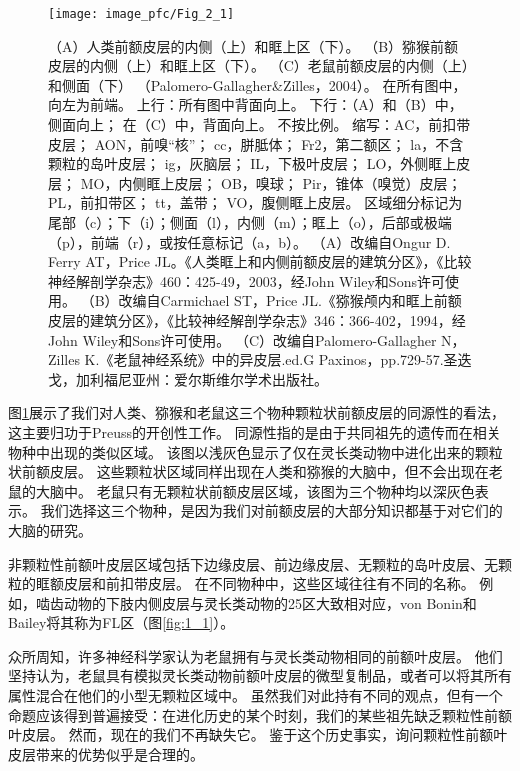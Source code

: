 \begin{figure}[!htb]
	\centering
	\texttt{[image: image\_pfc/Fig\_2\_1]}
	\caption{（A）人类前额皮层的内侧（上）和眶上区（下）\cite{ongur2003architectonic}。 
		（B）猕猴前额皮层的内侧（上）和眶上区（下）\cite{carmichael1994architectonic}。 
		（C）老鼠前额皮层的内侧（上）和侧面（下）
		（Palomero-Gallagher\&Zilles，2004）。
		在所有图中，向左为前端。
		上行：所有图中背面向上。
		下行：（A）和（B）中，侧面向上；
		在（C）中，背面向上。
		不按比例。
		缩写：AC，前扣带皮层；
		AON，前嗅“核”；
		cc，胼胝体；
		Fr2，第二额区；
		la，不含颗粒的岛叶皮层；
		ig，灰脑层；
		IL，下极叶皮层；
		LO，外侧眶上皮层；
		MO，内侧眶上皮层；
		OB，嗅球；
		Pir，锥体（嗅觉）皮层；
		PL，前扣带区；
		tt，盖带；
		VO，腹侧眶上皮层。
		区域细分标记为尾部（c）；下（i）；侧面（l），内侧（m）；眶上（o），后部或极端（p），前端（r），或按任意标记（a，b）。
		（A）改编自Ongur D. Ferry AT，Price JL。《人类眶上和内侧前额皮层的建筑分区》，《比较神经解剖学杂志》460：425-49，2003，经John Wiley和Sons许可使用。 
		（B）改编自Carmichael ST，Price JL.《猕猴颅内和眶上前额皮层的建筑分区》，《比较神经解剖学杂志》346：366-402，1994，经John Wiley和Sons许可使用。 
		（C）改编自Palomero-Gallagher N，Zilles K.《老鼠神经系统》中的异皮层.ed.G Paxinos，pp.729-57.圣迭戈，加利福尼亚州：爱尔斯维尔学术出版社。\label{fig:fig_2_1}}
\end{figure}

图\ref{fig:fig_2_1}展示了我们对人类、猕猴和老鼠这三个物种颗粒状前额皮层的同源性的看法，这主要归功于Preuss\cite{Preuss1991a}的开创性工作。
同源性指的是由于共同祖先的遗传而在相关物种中出现的类似区域。
该图以浅灰色显示了仅在灵长类动物中进化出来的颗粒状前额皮层。
这些颗粒状区域同样出现在人类和猕猴的大脑中，但不会出现在老鼠的大脑中。
老鼠只有无颗粒状前额皮层区域，该图为三个物种均以深灰色表示。
我们选择这三个物种，是因为我们对前额皮层的大部分知识都基于对它们的大脑的研究。


非颗粒性前额叶皮层区域包括下边缘皮层、前边缘皮层、无颗粒的岛叶皮层、无颗粒的眶额皮层和前扣带皮层。
在不同物种中，这些区域往往有不同的名称。
例如，啮齿动物的下肢内侧皮层与灵长类动物的25区大致相对应，von Bonin和Bailey将其称为FL区（图\ref{fig:1_1}）。


众所周知，许多神经科学家认为老鼠拥有与灵长类动物相同的前额叶皮层。
他们坚持认为，老鼠具有模拟灵长类动物前额叶皮层的微型复制品，或者可以将其所有属性混合在他们的小型无颗粒区域中\cite{kolb2007all,seamans2008comparing,schoenbaum2009new}。
虽然我们对此持有不同的观点，但有一个命题应该得到普遍接受：在进化历史的某个时刻，我们的某些祖先缺乏颗粒性前额叶皮层。
然而，现在的我们不再缺失它。
鉴于这个历史事实，询问颗粒性前额叶皮层带来的优势似乎是合理的。


